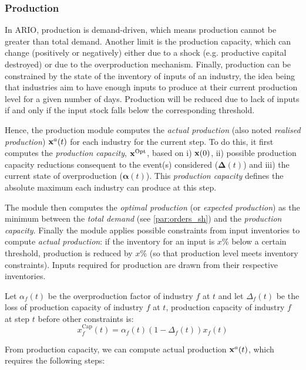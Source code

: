 \documentclass[main.tex]{subfiles}
\begin{document}
\subsubsection{Production}
\label{par:prod_sh}

In ARIO, production is demand-driven, which means production cannot be greater
than total demand. Another limit is the production capacity, which can change
(positively or negatively) either due to a shock (e.g. productive capital
destroyed) or due to the overproduction mechanism. Finally, production can be
constrained by the state of the inventory of inputs of an industry, the idea
being that industries aim to have enough inputs to produce at
their current production level for a given number of days. Production will
be reduced due to lack of inputs if and only if the input stock falls below the
corresponding threshold.

Hence, the production module computes the \emph{actual production} (also noted
\emph{realised production}) $\mathbf{x}^a(t)$ for each industry for the
current step. To do this, it first computes the \emph{production
  capacity}, $\mathbf{x}^{\textrm{Opt}}$, based on i) $\mathbf{x}(0)$, ii) possible production
capacity reductions consequent to the event(s) considered ($\bm{\Delta}(t)$) and
iii) the current state of overproduction ($\bm{\alpha}(t)$). This \emph{production
  capacity} defines the absolute maximum each industry can produce at this step.

The module then computes the \emph{optimal production} (or \emph{expected
  production}) as the minimum between the \emph{total demand} (see
\cref{par:orders_sh}) and the \emph{production capacity}. Finally the module
applies possible constraints from input
inventories to compute \emph{actual production}: if the inventory for
an input is $x$\% below a certain threshold, production is reduced by $x$\% (so
that production level meets inventory constraints). Inputs required for
production are drawn from their respective inventories.

Let \(\alpha_{f}(t)\) be the overproduction factor of industry
\(f\) at $t$ and let \(\Delta_{f}(t)\) be the loss of production capacity of
industry \(f\) at $t$, production capacity of industry \(f\) at step \(t\)
before other constraints is:
\begin{equation*}
  x^{\textrm{Cap}}_{f}(t) = \alpha_{f}(t) (1 - \Delta_{f}(t)) x_{f}(t)
\end{equation*}

From production capacity, we can compute actual production $\mathbf{x}^{a}(t)$, which requires the
following steps:
\end{document}
